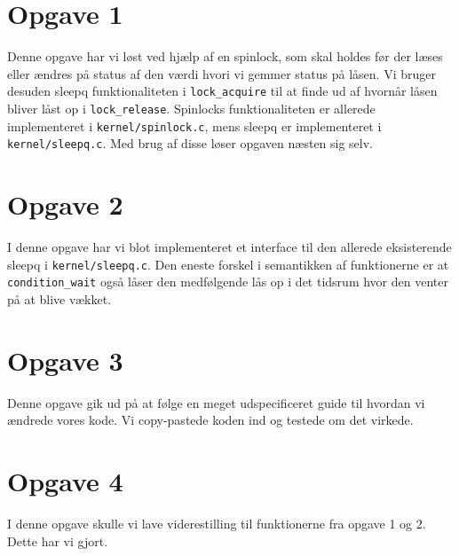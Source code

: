 



\maketitle

\tableofcontents

\thispagestyle{empty}

\section{Opgave 1}

Denne opgave har vi løst ved hjælp af en spinlock, som skal holdes før
der læses eller ændres på status af den værdi hvori vi gemmer status på
låsen. Vi bruger desuden sleepq funktionaliteten i {\tt lock\_acquire} til at
finde ud af hvornår låsen bliver låst op i {\tt lock\_release}. Spinlocks
funktionaliteten er allerede implementeret i {\tt kernel/spinlock.c}, mens
sleepq er implementeret i {\tt kernel/sleepq.c}. Med brug af disse løser
opgaven næsten sig selv.

\section{Opgave 2}

I denne opgave har vi blot implementeret et interface til den allerede
eksisterende sleepq i {\tt kernel/sleepq.c}. Den eneste forskel i semantikken af
funktionerne er at {\tt condition\_wait} også låser den medfølgende lås op i
det tidsrum hvor den venter på at blive vækket.

\section{Opgave 3}

Denne opgave gik ud på at følge en meget udspecificeret guide til hvordan
vi ændrede vores kode. Vi copy-pastede koden ind og testede om det virkede.

\section{Opgave 4}

I denne opgave skulle vi lave viderestilling til funktionerne fra opgave 1 og
2. Dette har vi gjort.


